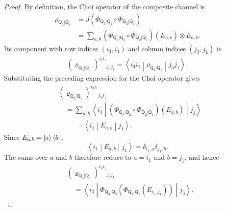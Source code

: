 \documentclass[
    aps,
    pra,
    reprint,
    superscriptaddress,
    nofootinbib
]{revtex4-2}
\theoremstyle{definition}
\theoremstyle{plain}
\begin{document}
\begin{proof}
    By definition, the Choi operator of the composite channel is
    \begin{equation}
        \begin{aligned}
        \rho_{\mathsf{Q}_{3}|\mathsf{Q}_{1}}
        &=
        J\left(
            \Phi_{\mathsf{Q}_{3}|\mathsf{Q}_{2}}
            \circ
            \Phi_{\mathsf{Q}_{2}|\mathsf{Q}_{1}}
        \right)\\
        &=
        \sum_{a,b}
        \left(
            \Phi_{\mathsf{Q}_{3}|\mathsf{Q}_{2}}
            \circ
            \Phi_{\mathsf{Q}_{2}|\mathsf{Q}_{1}}
        \right)(E_{a,b})
        \otimes E_{a,b}.
        \end{aligned}
    \end{equation}
    Its component with row indices $(i_{3},i_{1})$ and column indices
    $(j_{3},j_{1})$ is
    \begin{equation}
        \begin{aligned}
        \left(
            \varrho_{\mathsf{Q}_{3}|\mathsf{Q}_{1}}
        \right)^{i_{3}i_{1}}{}_{j_{3}j_{1}}
        =
        \left\langle i_{3}i_{1}\middle|
            \rho_{\mathsf{Q}_{3}|\mathsf{Q}_{1}}
        \middle|j_{3}j_{1}\right\rangle.
        \end{aligned}
    \end{equation}
    Substituting the preceding expression for the Choi operator gives
    \begin{align}
        &\left(
            \varrho_{\mathsf{Q}_{3}|\mathsf{Q}_{1}}
        \right)^{i_{3}i_{1}}{}_{j_{3}j_{1}}
        \nonumber\\
        &\quad=
        \sum_{a,b}
        \left\langle i_{3}\middle|
            \left(
                \Phi_{\mathsf{Q}_{3}|\mathsf{Q}_{2}}
                \circ
                \Phi_{\mathsf{Q}_{2}|\mathsf{Q}_{1}}
            \right)(E_{a,b})
        \middle|j_{3}\right\rangle
        \nonumber\\
        &\qquad\quad\cdot
        \left\langle i_{1}\middle|E_{a,b}\middle|j_{1}\right\rangle.
    \end{align}
    Since $E_{a,b}=\ket{a}\bra{b}$,
    \begin{equation}
        \left\langle i_{1}\middle|E_{a,b}\middle|j_{1}\right\rangle
        =
        \delta_{i_{1},a}\delta_{j_{1},b}.
    \end{equation}
    The sums over $a$ and $b$ therefore reduce to $a=i_{1}$ and
    $b=j_{1}$, and hence
    \begin{equation}
        \begin{aligned}
        &\left(
            \varrho_{\mathsf{Q}_{3}|\mathsf{Q}_{1}}
        \right)^{i_{3}i_{1}}{}_{j_{3}j_{1}}\\
        &\quad=
        \left\langle i_{3}\middle|
            \Phi_{\mathsf{Q}_{3}|\mathsf{Q}_{2}}
            \left(
                \Phi_{\mathsf{Q}_{2}|\mathsf{Q}_{1}}
                (E_{i_{1},j_{1}})
            \right)
        \middle|j_{3}\right\rangle.
        \end{aligned}
    \end{equation}


\end{proof}
\end{document}
